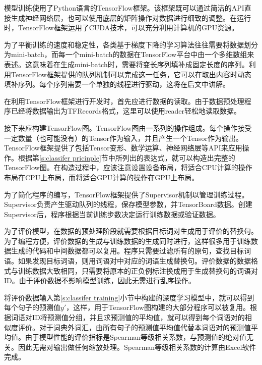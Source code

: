 \label{s:classifer training}
模型训练使用了Python语言的TensorFlow框架。该框架既可以通过简洁的API直接生成神经网络层，也可以使用底层的矩阵操作对数据进行细致的调整。在运行时，TensorFlow框架运用了CUDA技术，可以充分利用计算机的GPU资源。

为了平衡训练的速度和稳定性，各类基于梯度下降的学习算法往往需要将数据划分为mini-batch，而每一个mini-batch的数据在TensorFlow平台中由一个多维数组来表述。这意味着在生成mini-batch时，需要将变长序列填补成固定长度的序列。利用TensorFlow框架提供的队列机制可以完成这一任务，它可以在取出内容时动态填补序列。每个序列需要一个单独的线程进行驱动，这将在后文中讲解。

在利用TensorFlow框架进行开发时，首先应进行数据的读取。由于数据预处理程序已经将数据输出为TFRecords格式，这里可以使用reader轻松地读取数据。

接下来应构建TensorFlow图。TensorFlow图由一系列的操作组成。每个操作接受一定数量（也可能没有）的Tensor作为输入，并且产生一个Tensor作为输出。TensorFlow框架提供了包括Tensor变形、数学运算、神经网络层等API来应用操作。根据第\ref{s:classifer pricinple}节中所列出的表达式，就可以构造出完整的TensorFlow图。在构造过程中，应该注意设置设备布局，将适合CPU计算的操作布局在CPU上布局，而将适合GPU计算的操作在GPU上布局。

为了简化程序的编写，TensorFlow框架提供了Supervisor机制以管理训练过程。Supervisor负责产生驱动队列的线程，保存模型参数，并TensorBoard数据。创建Supervisor后，程序根据当前训练步数决定运行训练数据或验证数据。

为了评价模型，在数据的预处理阶段就需要根据目标词对生成用于评价的替换句。为了编程方便，评价数据的生成与训练数据的生成同时进行，这样很多用于训练数据生成的代码和中间数据都可以复用。程序只需要过滤所有的原句，查找目标词语。如果发现目标词语，则用词语对中对应的词语生成替换句。评价数据的数据格式与训练数据大致相同，只需要将原本的正负例标注换成用于生成替换句的词语对ID。由于评价数据不影响模型训练，因此无需进行乱序操作。

将评价数据输入第\ref{s:classifer training}小节中构建的深度学习模型中，就可以得到每个句子的预测值$y'$，这样，用于TensorFlow图构建的大部分程序可以被复用。根据词语对ID将预测值分组，并且求预测值的平均值，就可以得到每个词语对的相似度评价。对于词典外词汇，由所有句子的预测值平均值代替本词语对的预测值平均值。由于模型性能的评价指标是Spearman等级相关系数，与预测值的绝对值无关。因此无需对输出做任何缩放处理。Spearman等级相关系数的计算由Excel软件完成。

